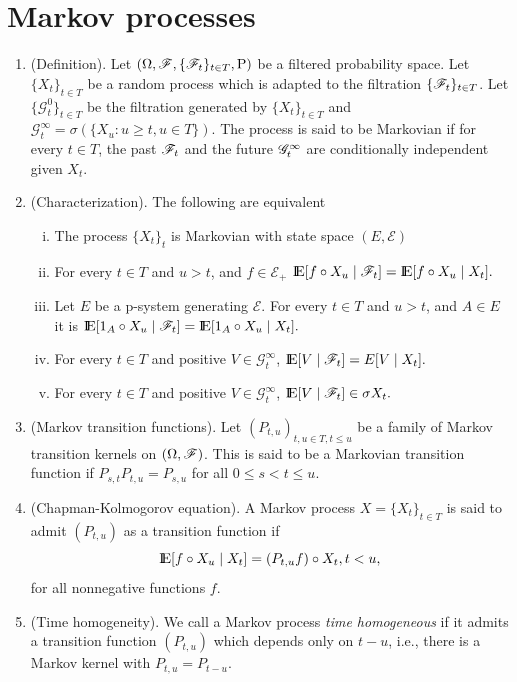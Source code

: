 \documentclass[a4paper,10pt]{scrbook}
\begin{document}
\section{Markov processes}
\begin{enumerate}
 \item (Definition). Let $(\Omega, \mathscr{F}, \{\mathscr{F}_t\}_{t\in T}, \mathrm{P})$ be a filtered probability space.
       Let $\{X_t\}_{t\in T}$ be a random process which is adapted to the filtration $\{\mathscr{F}_t\}_{t\in T}$.
       Let $\{\mathcal{G}^0_t\}_{t\in T}$ be the filtration generated by $\{X_t\}_{t\in T}$ and 
       $\mathcal{G}^\infty_t = \sigma(\{X_u: u\geq t, u\in T\})$. The process is said to be
       Markovian if for every $t\in T$, the past $\mathscr{F}_t$ and the future $\mathscr{G}^\infty_t$ are conditionally
       independent given $X_t$.
 \item (Characterization). The following are equivalent
       \begin{enumerate}[i.]
        \item The process $\{X_t\}_t$ is Markovian with state space $(E, \mathcal{E})$
        \item For every $t\in T$ and $u>t$, and $f\in\mathcal{E}_+$
           $
             \E[f\circ X_u\mid \F_t] = \E[f\circ X_u\mid X_t].
           $
        \item Let $E$ be a p-system generating $\mathcal{E}$.
              For every $t\in T$ and $u>t$, and $A\in E$ it is
              $
                \E[1_A\circ X_u\mid \F_t] = \E[1_A\circ X_u\mid X_t].
              $
        \item For every $t\in T$ and positive $V\in \mathcal{G}^\infty_t$,
           $
             \E[V\mid \F_t] = E[V\mid X_t].
           $
        \item For every $t\in T$ and positive $V\in \mathcal{G}^\infty_t$,
           $
             \E[V\mid \F_t] \in \sigma X_t.
           $
       \end{enumerate}
  \item (Markov transition functions). Let $(P_{t,u})_{t,u\in T, t\leq u}$ be a family of Markov transition kernels on $(\Omega, \mathscr{F})$. This is said to be a Markovian transition function if $P_{s,t}P_{t,u} = P_{s,u}$ for all $0\leq s < t \leq u$.
  \item (Chapman-Kolmogorov equation). A Markov process $X=\{X_t\}_{t\in T}$ is said to admit $(P_{t,u})$ as a transition function if 
  \[
   \E[f\circ X_u \mid X_t] = (P_{t,u}f)\circ X_t, t<u,
  \]
  for all nonnegative functions $f$.
  \item (Time homogeneity). We call a Markov process \textit{time homogeneous} if it admits a transition function $(P_{t,u})$ which depends only on $t-u$, i.e., there is a Markov kernel with $P_{t,u}=P_{t-u}$.
   

\end{enumerate}
\end{document}
